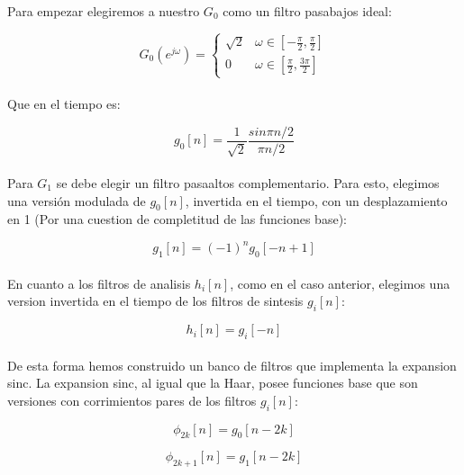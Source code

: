 \paragraph{}
Para empezar elegiremos a nuestro $G_{0}$ como un filtro pasabajos ideal:

\[ G_{0}(e^{j\omega}) = \begin{cases} 
      \sqrt{2} & \omega \in [-\frac{\pi}{2}, \frac{\pi}{2}] \\
      0 & \omega \in [\frac{\pi}{2}, \frac{3\pi}{2}]
   \end{cases}
\]

\paragraph{}
Que en el tiempo es:

\begin{equation}
  g_{0}[n] = \frac{1}{\sqrt{2}} \frac{sin \pi n / 2}{\pi n / 2}
\end{equation}

\paragraph{}
Para $G_{1}$ se debe elegir un filtro pasaaltos complementario. Para esto, elegimos una versión modulada de $g_{0}[n]$, invertida en el tiempo, con un desplazamiento en 1 (Por una cuestion de completitud de las funciones base):

\begin{equation}
  g_{1}[n] = (-1)^n g_{0}[-n + 1]
\end{equation}

\paragraph{}
En cuanto a los filtros de analisis $h_{i}[n]$, como en el caso anterior, elegimos una version invertida en el tiempo de los filtros de sintesis $g_{i}[n]$:

\begin{equation}
  h_{i}[n] = g_{i}[-n]
\end{equation}

\paragraph{}
De esta forma hemos construido un banco de filtros que implementa la expansion sinc. La expansion sinc, al igual que la Haar, posee funciones base que son versiones con corrimientos pares de los filtros $g_{i}[n]$:

\begin{equation}
  \phi_{2k}[n] = g_{0}[n - 2k]
\end{equation}

\begin{equation}
  \phi_{2k + 1}[n] = g_{1}[n - 2k]
\end{equation}

